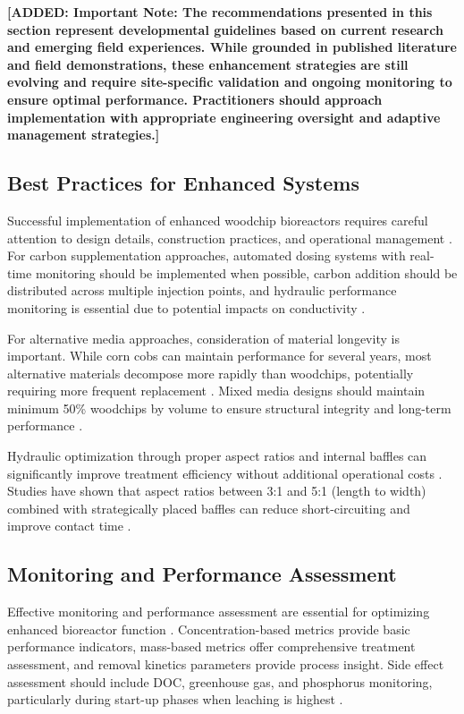 \documentclass[12pt,a4paper]{article}
\newcommand{\added}[1]{\textcolor{addedtext}{\textbf{[ADDED: #1]}}}
\begin{document}
\added{\textbf{Important Note}: The recommendations presented in this section represent developmental guidelines based on current research and emerging field experiences. While grounded in published literature and field demonstrations, these enhancement strategies are still evolving and require site-specific validation and ongoing monitoring to ensure optimal performance. Practitioners should approach implementation with appropriate engineering oversight and adaptive management strategies.}

\subsection{Best Practices for Enhanced Systems}

Successful implementation of enhanced woodchip bioreactors requires careful attention to design details, construction practices, and operational management \citep{RN310, RN312}. For carbon supplementation approaches, automated dosing systems with real-time monitoring should be implemented when possible, carbon addition should be distributed across multiple injection points, and hydraulic performance monitoring is essential due to potential impacts on conductivity \citep{RN632}.

For alternative media approaches, consideration of material longevity is important. While corn cobs can maintain performance for several years, most alternative materials decompose more rapidly than woodchips, potentially requiring more frequent replacement \citep{RN350, RN624}. Mixed media designs should maintain minimum 50\% woodchips by volume to ensure structural integrity and long-term performance \citep{RN350}.

Hydraulic optimization through proper aspect ratios and internal baffles can significantly improve treatment efficiency without additional operational costs \citep{RN309}. Studies have shown that aspect ratios between 3:1 and 5:1 (length to width) combined with strategically placed baffles can reduce short-circuiting and improve contact time \citep{RN309}.

\subsection{Monitoring and Performance Assessment}

Effective monitoring and performance assessment are essential for optimizing enhanced bioreactor function \citep{RN310, RN312}. Concentration-based metrics provide basic performance indicators, mass-based metrics offer comprehensive treatment assessment, and removal kinetics parameters provide process insight. Side effect assessment should include DOC, greenhouse gas, and phosphorus monitoring, particularly during start-up phases when leaching is highest \citep{RN291, RN1181}.
\end{document}
